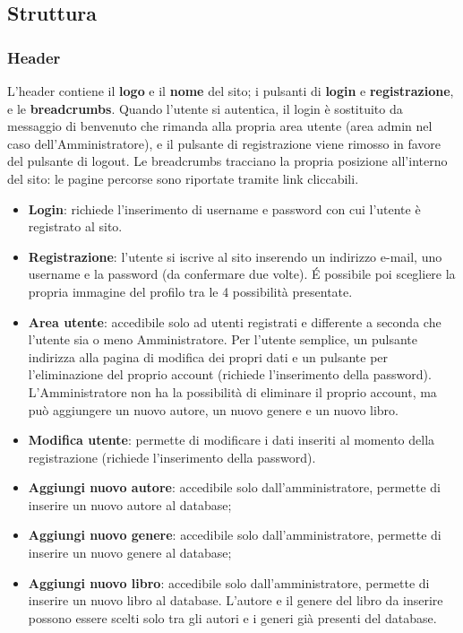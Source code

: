 \documentclass[12pt,a4paper,headings=optiontohead]{article}
\begin{document}
	
	\newpage
	\subsection{Struttura}
	
	
	\subsubsection{Header}
	
	L'header contiene il \textbf{logo} e il \textbf{nome} del sito; i pulsanti di \textbf{login} e \textbf{registrazione}, e le \textbf{breadcrumbs}. 
	Quando l'utente si autentica, il login è sostituito da messaggio di benvenuto che rimanda alla propria area utente (area admin nel caso dell'Amministratore), e il pulsante di registrazione viene rimosso in favore del pulsante di logout.
	Le breadcrumbs tracciano la propria posizione all'interno del sito: le pagine percorse sono riportate tramite link cliccabili. 
	\begin{itemize}
		\item \textbf{Login}: richiede l'inserimento di username e password con cui l'utente è registrato al sito.
		\item \textbf{Registrazione}: l'utente si iscrive al sito inserendo un indirizzo e-mail, uno username e la password (da confermare due volte). \'E possibile poi scegliere la propria immagine del profilo tra le 4 possibilità presentate.
		\item \textbf{Area utente}: accedibile solo ad utenti registrati e differente a seconda che l'utente sia o meno Amministratore. Per l'utente semplice, un pulsante indirizza alla pagina di modifica dei propri dati e un pulsante per l'eliminazione del proprio account (richiede l'inserimento della password). L'Amministratore non ha la possibilità di eliminare il proprio account, ma può aggiungere un nuovo autore, un nuovo genere e un nuovo libro.
		\item \textbf{Modifica utente}: permette di modificare i dati inseriti al momento della registrazione (richiede l'inserimento della password).
		\item \textbf{Aggiungi nuovo autore}: accedibile solo dall'amministratore, permette di inserire un nuovo autore al database; 
		\item \textbf{Aggiungi nuovo genere}: accedibile solo dall'amministratore, permette di inserire un nuovo genere al database; 
		\item \textbf{Aggiungi nuovo libro}: accedibile solo dall'amministratore, permette di inserire un nuovo libro al database. L'autore e il genere del libro da inserire possono essere scelti solo tra gli autori e i generi già presenti del database.
	\end{itemize}
	
\end{document}

